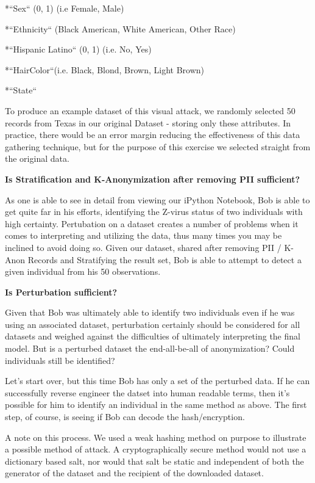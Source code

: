 \documentclass[10pt,journal,compsoc]{IEEEtran}
\begin{document}
		*``Sex`` (0, 1) (i.e Female, Male)
		
		*``Ethnicity`` (Black American, White American, Other Race)
		
		*``Hispanic Latino`` (0, 1) (i.e. No, Yes)
		
		*``HairColor``(i.e. Black, Blond, Brown, Light Brown)
		
		*``State``
		
To produce an example dataset of this visual attack, we randomly selected 50 records from Texas in our original Dataset - storing only these attributes. In practice, there would be an error margin reducing the effectiveness of this data gathering technique, but for the purpose of this exercise we selected straight from the original data.   \linebreak


\noindent \textbf {Is Stratification and K-Anonymization after removing PII sufficient?}

As one is able to see in detail from viewing our iPython Notebook, Bob is able to get quite far in his efforts, identifying the Z-virus status of two individuals with high certainty.  Pertubation on a dataset creates a number of problems when it comes to interpreting and utilizing the data, thus many times you may be inclined to avoid doing so. Given our dataset, shared after removing PII / K-Anon Records and Stratifying the result set, Bob is able to attempt to detect a given individual from his 50 observations.

\noindent \textbf{Is Perturbation sufficient?}

Given that Bob was ultimately able to identify two individuals even if he was using an associated dataset, perturbation certainly should be considered for all datasets and weighed against the difficulties of ultimately interpreting the final model. But is a perturbed dataset the end-all-be-all of anonymization? Could individuals still be identified?

Let's start over, but this time Bob has only a set of the perturbed data. If he can successfully reverse engineer the datset into human readable terms, then it's possible for him to identify an individual in the same method as above.
The first step, of course, is seeing if Bob can decode the hash/encryption.

A note on this process. We used a weak hashing method on purpose to illustrate a possible method of attack. A cryptographically secure method would not use a dictionary based salt, nor would that salt be static and independent of both the generator of the dataset and the recipient of the downloaded dataset.
\end{document}
